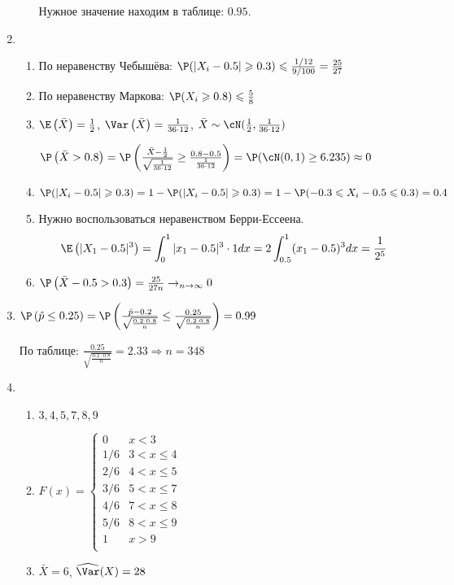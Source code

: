 \begin{enumerate}
\begin{enumerate}
Нужное значение находим в таблице: $0.95$.
\end{enumerate}
\item
\begin{enumerate}
\item По неравенству Чебышёва:
$\P(|X_i-0.5|\geqslant 0.3) \leqslant \frac{1/12}{9/100} = \frac{25}{27}$
\item По неравенству Маркова: $\P(X_i \geqslant 0.8) \leqslant \frac{5}{8}$
\item $\E\left(\bar{X}\right) = \frac{1}{2}$,
$\Var\left(\bar{X}\right) = \frac{1}{36\cdot 12}$, $\bar{X}\sim\cN(\frac{1}{2}, \frac{1}{36\cdot12})$

$\P\left(\bar{X} > 0.8\right) = \P\left(\frac{\bar{X} - \frac{1}{2}}{\sqrt{ \frac{1}{36\cdot 12}}} \geq \frac{0.8-0.5}{ \frac{1}{36\cdot 12}} \right) = \P(\cN(0,1) \geq 6.235) \approx 0$
\item $ \P(|X_i-0.5|\geqslant 0.3) = 1 - \P(|X_i-0.5|\geqslant 0.3) = 1 - \P(-0.3 \leqslant X_i - 0.5 \leqslant 0.3) = 0.4$
\item Нужно воспользоваться неравенством Берри-Ессеена.
\[
\E\left(|X_1 - 0.5|^3\right) = \int_0^1 |x_1 -0.5|^3 \cdot 1 dx = 2 \int_{0.5}^1 (x_1 - 0.5)^3 dx = \frac{1}{2^5}
\]
\item $\P\left(\bar{X} - 0.5 > 0.3\right) = \frac{25}{27n} \to_{n \to \infty} 0$
\end{enumerate}
\item $\P\left(\hat{p} \leq 0.25\right) = \P\left(\frac{\hat{p} - 0.2}{\sqrt{\frac{0.2\cdot0.8}{n}}} \leq \frac{0.25}{\sqrt{\frac{0.2\cdot0.8}{n}}}\right) = 0.99$

По таблице: $\frac{0.25}{\sqrt{\frac{0.2\cdot0.8}{n}}} = 2.33 \Rightarrow n = 348$
\item
\begin{enumerate}
\item $3, 4, 5, 7, 8, 9$
\item $F(x) = \begin{cases}
0 &  x < 3 \\
1/6 & 3 < x \leq 4 \\
2/6 & 4 < x \leq 5 \\
3/6 & 5 < x \leq 7 \\
4/6 & 7 < x \leq 8 \\
5/6 & 8 < x \leq 9 \\
1 &  x > 9 \\
\end{cases}$
\item $\bar{X} = 6$, $\widehat{\Var}(X) = 28$
\end{enumerate}
\end{enumerate}




